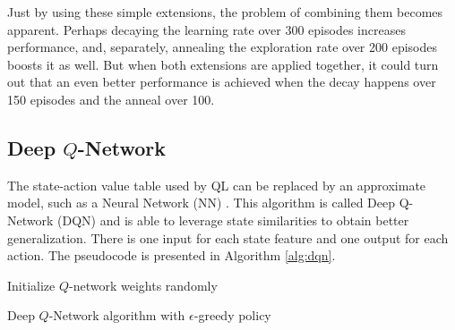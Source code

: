 \documentclass{article}
\begin{document}
Just by using these simple extensions, the problem of combining them becomes apparent. Perhaps decaying the learning rate over 300 episodes increases performance, and, separately, annealing the exploration rate over 200 episodes boosts it as well. But when both extensions are applied together, it could turn out that an even better performance is achieved when the decay happens over 150 episodes and the anneal over 100.


\subsection{Deep $Q$-Network}
\label{subsec:dqn}
The state-action value table used by QL can be replaced by an approximate model, such as a Neural Network (NN) \cite{bishop}. This algorithm is called Deep Q-Network (DQN) \cite{dqn} and is able to leverage state similarities to obtain better generalization. There is one input for each state feature and one output for each action. The pseudocode is presented in Algorithm \ref{alg:dqn}.

\begin{algorithm}[!h]
Initialize $Q$-network weights randomly\\
\caption{Deep $Q$-Network algorithm with $\epsilon$-greedy policy}
\label{alg:dqn}
\end{algorithm}
\end{document}
